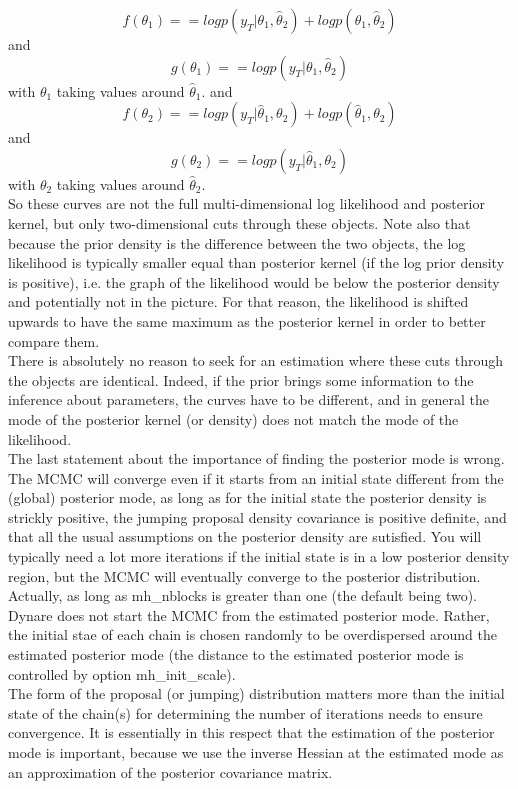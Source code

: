 \documentclass[10pt,math=newtx,citestyle=gb7714-2015,bibstyle=gb7714-2015]{elegantbook}
\begin{document}
{{{\begin{enumerate}
{			$$f(\theta_1)==logp(y_T|\theta_1,\hat{\theta}_2)+logp(\theta_1,\hat{\theta}_2)$$
			and
			$$g(\theta_1)==logp(y_T|\theta_1,\hat{\theta}_2)$$
			with $\theta_1$ taking values around $\hat{\theta}_1$. and
			$$f(\theta_2)==logp(y_T|\hat{\theta}_1,\theta_2)+logp(\hat{\theta}_1,\theta_2)$$
			and
			$$g(\theta_2)==logp(y_T|\hat{\theta}_1,\theta_2)$$
			with $\theta_2$ taking values around $\hat{\theta}_2$. \\
			So these curves are not the full multi-dimensional log likelihood and posterior kernel, but only two-dimensional cuts through these objects. Note also that because the prior density is the difference between the two objects, the log likelihood is typically smaller equal than posterior kernel (if the log prior density is positive), i.e. the graph of the likelihood would be below the posterior density and potentially not in the picture. For that reason, the likelihood is shifted upwards to have the same maximum as the posterior kernel in order to better compare them.\\
			There is absolutely no reason to seek for an estimation where these cuts through the objects are identical. Indeed, if the prior brings some information to the inference about parameters, the curves have to be different, and in general the mode of the posterior kernel (or density) does not match the mode of the likelihood.\\
			The last statement about the importance of finding the posterior mode is wrong. The MCMC will converge even if it starts from an initial state different from the (global) posterior mode, as long as for the initial state the posterior density is strickly positive, the jumping proposal density covariance is positive definite, and that all the usual assumptions on the posterior density are sutisfied. You will typically need a lot more iterations if the initial state is in a low posterior density region, but the MCMC will eventually converge to the posterior distribution. Actually, as long as mh\_nblocks is greater than one (the default being two). Dynare does not start the MCMC from the estimated posterior mode. Rather, the initial stae of each chain is chosen randomly to be overdispersed around the estimated posterior mode (the distance to the estimated posterior mode is controlled by option mh\_init\_scale).\\
			The form of the proposal (or jumping) distribution matters more than the initial state of the chain(s) for determining the number of iterations needs to ensure convergence. It is essentially in this respect that the estimation of the posterior mode is important, because we use the inverse Hessian at the estimated mode as an approximation of the posterior covariance matrix.}

\end{enumerate}}}}
\end{document}
